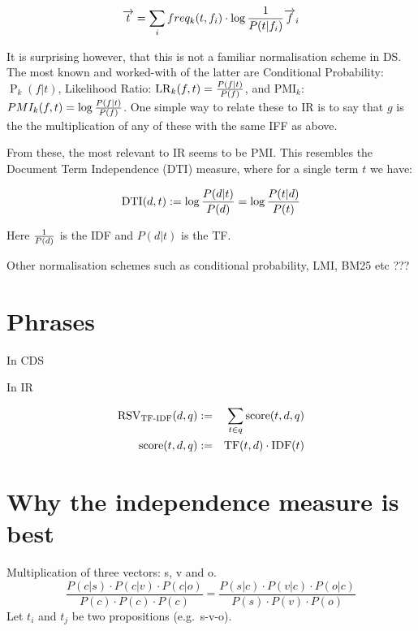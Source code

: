 \begin{equation}
\label{vector-word-idf}
\overrightarrow{t}  = \sum_i  freq_k(t,f_i) \cdot \log{1 \over P(t|f_i)}  \overrightarrow{f}_i
\end{equation}


It is surprising however,   that this is not a familiar normalisation scheme in DS. The  most known and worked-with of the latter are  Conditional Probability: $\operatorname{P}_k(f|t)$,  Likelihood Ratio: $\operatorname{LR}_k(f,t) 
= {{P(f \mid t)} \over{P(f)}}$,  and PMI$_k$: $PMI_k (f, t) =  \log{{P(f \mid t)} \over{P(f)}}$.  One simple way to relate these to IR is to say that $g$ is the the multiplication of any of these with the same  IFF as above. 


From these,  the most relevant to IR seems to be PMI. This resembles the Document Term Independence (DTI) measure, where  for a single term $t$ we have:

\begin{equation}
\label{independence}
\textmd{DTI}(d,t) := \log\frac{P(d | t)}{P(d)} = \log\frac{P(t|d)}{P(t)}
\end{equation}


Here  ${1} \over {P(d)}$ is the IDF and  $P(d| t)$ is the TF. 





Other normalisation schemes such as conditional probability, LMI, BM25 etc ???

\section{Phrases}

In CDS


In IR



\begin{eqnarray}
\label{tf-idf-phrase}
\textmd{RSV}_\textmd{TF-IDF}(d,q) &:=& \sum_{t \in q} \textmd{score}(t,d,q)\\
\textmd{score}(t,d,q) &:=&
\textmd{TF}(t,d) \cdot \textmd{IDF}(t)
\end{eqnarray}

\section{Why the independence measure is best}

Multiplication of three vectors: s, v and o.
\[
\frac{
P(c|s) \cdot P(c|v) \cdot P(c|o)}{
P(c) \cdot P(c) \cdot P(c)} =
\frac{
P(s|c) \cdot P(v|c) \cdot P(o|c)
}{
P(s) \cdot P(v) \cdot P(o)
}
\]
Let $t_i$ and $t_j$ be two propositions
(e.g.~s-v-o).

